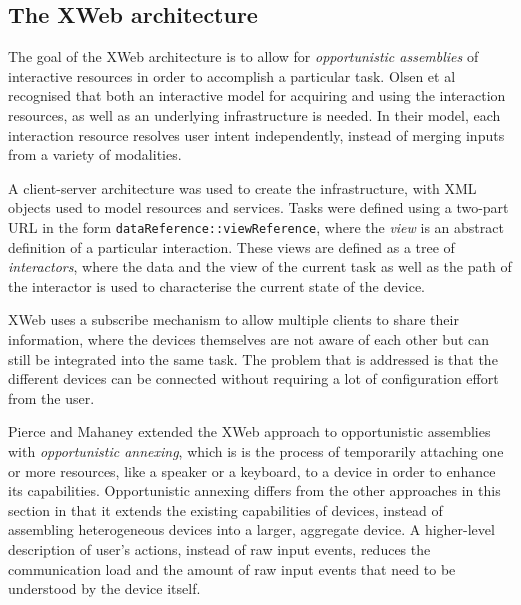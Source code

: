 

\subsection{The XWeb architecture}
The goal of the XWeb architecture \cite{Olsen2001} is to allow for \emph{opportunistic assemblies} of interactive resources in order to accomplish a particular task. Olsen et al recognised that both an interactive model for acquiring and using the interaction resources, as well as an underlying infrastructure is needed. In their model, each interaction resource resolves user intent independently, instead of merging inputs from a variety of modalities.

A client-server architecture was used to create the infrastructure, with \ac{XML} objects used to model resources and services. Tasks were defined using a two-part \ac{URL} in the form \texttt{dataReference::viewReference}, where the \emph{view} is an abstract definition of a particular interaction. These views are defined as a tree of \emph{interactors}, where the data and the view of the current task as well as the path of the interactor is used to characterise the current state of the device.

XWeb uses a subscribe mechanism to allow multiple clients to share their information, where the devices themselves are not aware of each other but can still be integrated into the same task. The problem that is addressed is that the different devices can be connected without requiring a lot of configuration effort from the user.

Pierce and Mahaney \cite{Pierce2003} extended the XWeb approach to opportunistic assemblies with \emph{opportunistic annexing}, which is is the process of temporarily attaching one or more resources, like a speaker or a keyboard, to a device in order to enhance its capabilities. Opportunistic annexing differs from the other approaches in this section in that it extends the existing capabilities of devices, instead of assembling heterogeneous devices into a larger, aggregate device. A higher-level description of user's actions, instead of raw input events, reduces the communication load and the amount of raw input events that need to be understood by the device itself. 


